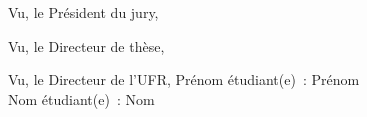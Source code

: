 \thispagestyle{empty}
\par\hspace{10cm}Vu, le Président du jury,
\vspace{6cm}
\par\hspace{10cm}Vu, le Directeur de thèse,
\vspace{6cm}
\par\hspace{10cm}Vu, le Directeur de l'UFR,\vfill
Prénom étudiant(e)~: Prénom\\
Nom étudiant(e)~: Nom